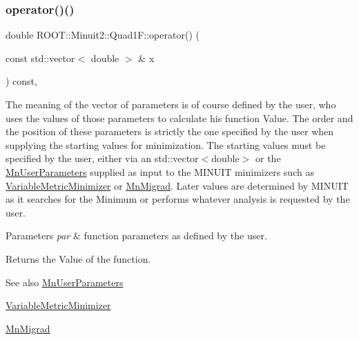 \mbox{\label{classROOT_1_1Minuit2_1_1Quad1F_a879588547439114ea9ad1e749f1300c5}} 
\subsubsection{\texorpdfstring{operator()()}{operator()()}\hspace{0.1cm}{\footnotesize\ttfamily [1/2]}}
{\footnotesize\ttfamily double R\+O\+O\+T\+::\+Minuit2\+::\+Quad1\+F\+::operator() (\begin{DoxyParamCaption}\item[{const std\+::vector$<$ double $>$ \&}]{x }\end{DoxyParamCaption}) const\hspace{0.3cm}{\ttfamily [inline]}, {\ttfamily [virtual]}}

The meaning of the vector of parameters is of course defined by the user, who uses the values of those parameters to calculate his function Value. The order and the position of these parameters is strictly the one specified by the user when supplying the starting values for minimization. The starting values must be specified by the user, either via an std\+::vector$<$double$>$ or the \mbox{\hyperlink{classROOT_1_1Minuit2_1_1MnUserParameters}{Mn\+User\+Parameters}} supplied as input to the M\+I\+N\+U\+IT minimizers such as \mbox{\hyperlink{classROOT_1_1Minuit2_1_1VariableMetricMinimizer}{Variable\+Metric\+Minimizer}} or \mbox{\hyperlink{classROOT_1_1Minuit2_1_1MnMigrad}{Mn\+Migrad}}. Later values are determined by M\+I\+N\+U\+IT as it searches for the Minimum or performs whatever analysis is requested by the user.


\begin{DoxyParams}{Parameters}
{\em par} & function parameters as defined by the user.\\
\hline
\end{DoxyParams}
\begin{DoxyReturn}{Returns}
the Value of the function.
\end{DoxyReturn}
\begin{DoxySeeAlso}{See also}
\mbox{\hyperlink{classROOT_1_1Minuit2_1_1MnUserParameters}{Mn\+User\+Parameters}} 

\mbox{\hyperlink{classROOT_1_1Minuit2_1_1VariableMetricMinimizer}{Variable\+Metric\+Minimizer}} 

\mbox{\hyperlink{classROOT_1_1Minuit2_1_1MnMigrad}{Mn\+Migrad}} 
\end{DoxySeeAlso}


